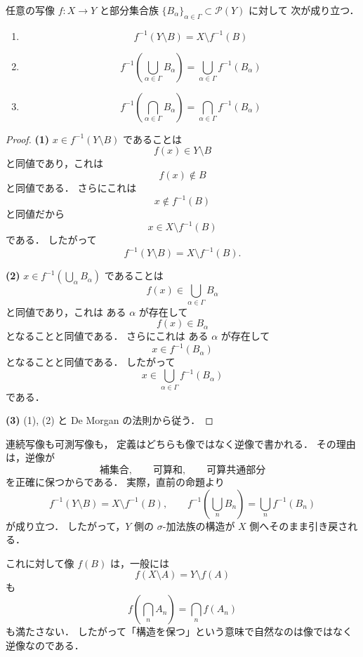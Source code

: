 \begin{proposition}[逆像の基本性質]
任意の写像 $f:X\to Y$ と部分集合族 $\{B_\alpha\}_{\alpha\in\Gamma}\subset \mathcal P(Y)$ に対して
次が成り立つ．
\begin{enumerate}
    \item
    \[
    f^{-1}(Y\setminus B)=X\setminus f^{-1}(B)
    \]
    \item
    \[
    f^{-1}\left(\bigcup_{\alpha\in\Gamma}B_\alpha\right)
    =
    \bigcup_{\alpha\in\Gamma}f^{-1}(B_\alpha)
    \]
    \item
    \[
    f^{-1}\left(\bigcap_{\alpha\in\Gamma}B_\alpha\right)
    =
    \bigcap_{\alpha\in\Gamma}f^{-1}(B_\alpha)
    \]
\end{enumerate}
\end{proposition}
\begin{proof}
\textbf{(1)}\quad
$x\in f^{-1}(Y\setminus B)$ であることは
\[
f(x)\in Y\setminus B
\]
と同値であり，これは
\[
f(x)\notin B
\]
と同値である．
さらにこれは
\[
x\notin f^{-1}(B)
\]
と同値だから
\[
x\in X\setminus f^{-1}(B)
\]
である．
したがって
\[
f^{-1}(Y\setminus B)=X\setminus f^{-1}(B).
\]

\textbf{(2)}\quad
$x\in f^{-1}(\bigcup_\alpha B_\alpha)$ であることは
\[
f(x)\in \bigcup_{\alpha\in\Gamma}B_\alpha
\]
と同値であり，これは
ある $\alpha$ が存在して
\[
f(x)\in B_\alpha
\]
となることと同値である．
さらにこれは
ある $\alpha$ が存在して
\[
x\in f^{-1}(B_\alpha)
\]
となることと同値である．
したがって
\[
x\in \bigcup_{\alpha\in\Gamma}f^{-1}(B_\alpha)
\]
である．

\textbf{(3)}\quad
(1), (2) と De Morgan の法則から従う．
\end{proof}

\begin{remark}[可測写像の定義が逆なのはなぜか]
連続写像も可測写像も，
定義はどちらも像ではなく逆像で書かれる．
その理由は，逆像が
\[
\text{補集合},\qquad \text{可算和},\qquad \text{可算共通部分}
\]
を正確に保つからである．
実際，直前の命題より
\[
f^{-1}(Y\setminus B)=X\setminus f^{-1}(B),
\qquad
f^{-1}\left(\bigcup_n B_n\right)=\bigcup_n f^{-1}(B_n)
\]
が成り立つ．
したがって，$Y$ 側の $\sigma$-加法族の構造が
$X$ 側へそのまま引き戻される．

これに対して像 $f(B)$ は，一般には
\[
f(X\setminus A)=Y\setminus f(A)
\]
も
\[
f\left(\bigcap_n A_n\right)=\bigcap_n f(A_n)
\]
も満たさない．
したがって「構造を保つ」という意味で自然なのは像ではなく逆像なのである．
\end{remark}

